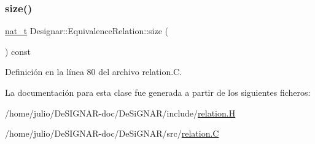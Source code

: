 \subsubsection{\texorpdfstring{size()}{size()}}
{\footnotesize\ttfamily \hyperlink{namespace_designar_aa72662848b9f4815e7bf31a7cf3e33d1}{nat\+\_\+t} Designar\+::\+Equivalence\+Relation\+::size (\begin{DoxyParamCaption}{ }\end{DoxyParamCaption}) const}



Definición en la línea 80 del archivo relation.\+C.



La documentación para esta clase fue generada a partir de los siguientes ficheros\+:\begin{DoxyCompactItemize}
\item 
/home/julio/\+De\+S\+I\+G\+N\+A\+R-\/doc/\+De\+Si\+G\+N\+A\+R/include/\hyperlink{relation_8_h}{relation.\+H}\item 
/home/julio/\+De\+S\+I\+G\+N\+A\+R-\/doc/\+De\+Si\+G\+N\+A\+R/src/\hyperlink{relation_8_c}{relation.\+C}\end{DoxyCompactItemize}
